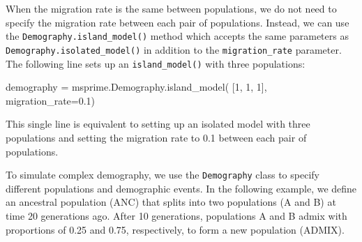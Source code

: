 \documentclass[graybox]{svmult}
\begin{document}
\label{island-model}
When the migration rate is the same between populations, we do not
need to specify the migration rate between each pair of populations. Instead,
we can use the \texttt{Demography.island\_model()} method which accepts
the same parameters as \texttt{Demography.isolated\_model()} in
addition to the \texttt{migration\_rate} parameter. The following line sets up an
\texttt{island\_model()} with three populations:
\begin{pythoncode}
    demography = msprime.Demography.island_model(
        [1, 1, 1], migration_rate=0.1)
\end{pythoncode}
This single line is equivalent to setting up an isolated model with three populations
and setting the migration rate to 0.1 between each pair of populations.




\label{Complex-demography}
To simulate complex demography, we use the \texttt{Demography} class to specify different
populations and demographic events. In the following example, we define
an ancestral population (ANC) that splits into two populations (A and B) at time
20 generations ago. After 10 generations, populations A and B admix with proportions of 0.25
and 0.75, respectively, to form a new population (ADMIX).
\end{document}
